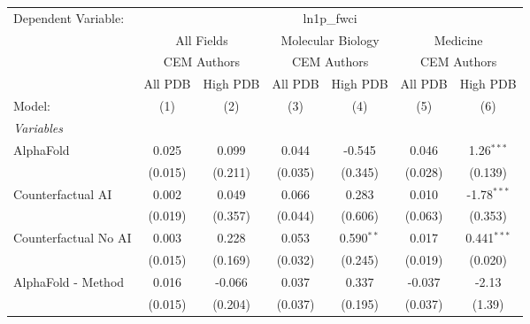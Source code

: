 \begingroup
\centering
\begin{tabular}{lcccccc}
   \tabularnewline \midrule \midrule
   Dependent Variable: & \multicolumn{6}{c}{ln1p\_fwci}\\
 & \multicolumn{2}{c}{All Fields} & \multicolumn{2}{c}{Molecular Biology} & \multicolumn{2}{c}{Medicine} \\
\cmidrule(lr){2-3} \cmidrule(lr){4-5} \cmidrule(lr){6-7}
 & \multicolumn{2}{c}{CEM Authors} & \multicolumn{2}{c}{CEM Authors} & \multicolumn{2}{c}{CEM Authors} \\
\cmidrule(lr){2-3} \cmidrule(lr){4-5} \cmidrule(lr){6-7}
 & \multicolumn{1}{c}{All PDB} & \multicolumn{1}{c}{High PDB} & \multicolumn{1}{c}{All PDB} & \multicolumn{1}{c}{High PDB} & \multicolumn{1}{c}{All PDB} & \multicolumn{1}{c}{High PDB} \\
\cmidrule(lr){2-2} \cmidrule(lr){3-3} \cmidrule(lr){4-4} \cmidrule(lr){5-5} \cmidrule(lr){6-6} \cmidrule(lr){7-7}
   Model:                                                     & (1)         & (2)        & (3)     & (4)          & (5)     & (6)\\  
   \midrule
   \emph{Variables}\\
   AlphaFold                                                  & 0.025       & 0.099      & 0.044   & -0.545       & 0.046   & 1.26$^{***}$\\   
                                                              & (0.015)     & (0.211)    & (0.035) & (0.345)      & (0.028) & (0.139)\\   
   Counterfactual AI                                          & 0.002       & 0.049      & 0.066   & 0.283        & 0.010   & -1.78$^{***}$\\   
                                                              & (0.019)     & (0.357)    & (0.044) & (0.606)      & (0.063) & (0.353)\\   
   Counterfactual No AI                                       & 0.003       & 0.228      & 0.053   & 0.590$^{**}$ & 0.017   & 0.441$^{***}$\\   
                                                              & (0.015)     & (0.169)    & (0.032) & (0.245)      & (0.019) & (0.020)\\   
   AlphaFold - Method                                         & 0.016       & -0.066     & 0.037   & 0.337        & -0.037  & -2.13\\   
                                                              & (0.015)     & (0.204)    & (0.037) & (0.195)      & (0.037) & (1.39)\\   

\end{tabular}
